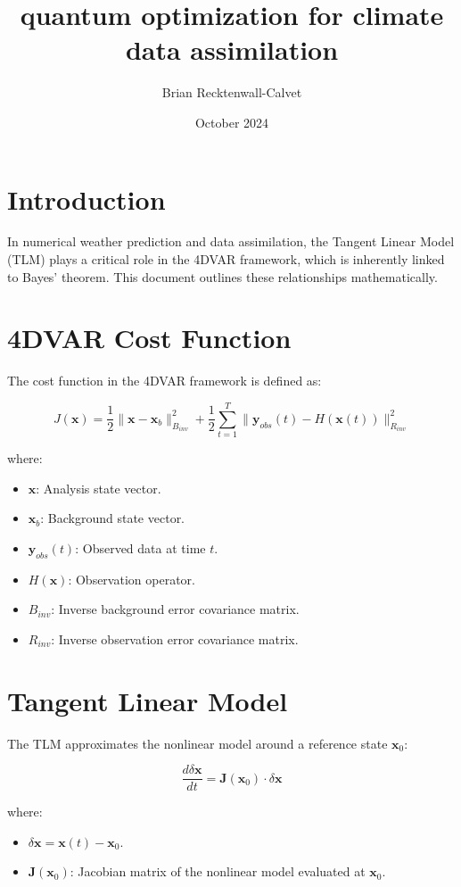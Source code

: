 \documentclass{article}
\title{quantum optimization for climate data assimilation}
\author{Brian Recktenwall-Calvet}
\date{October 2024}
\begin{document}
\maketitle

\section{Introduction}

In numerical weather prediction and data assimilation, the Tangent Linear Model (TLM) plays a critical role in the 4DVAR framework, which is inherently linked to Bayes' theorem. This document outlines these relationships mathematically.

\section{4DVAR Cost Function}

The cost function in the 4DVAR framework is defined as:

\[
J(\mathbf{x}) = \frac{1}{2} \|\mathbf{x} - \mathbf{x}_b\|_{B_{inv}}^2 + \frac{1}{2} \sum_{t=1}^{T} \|\mathbf{y}_{obs}(t) - H(\mathbf{x}(t))\|_{R_{inv}}^2
\]

where:
\begin{itemize}
    \item \( \mathbf{x} \): Analysis state vector.
    \item \( \mathbf{x}_b \): Background state vector.
    \item \( \mathbf{y}_{obs}(t) \): Observed data at time \( t \).
    \item \( H(\mathbf{x}) \): Observation operator.
    \item \( B_{inv} \): Inverse background error covariance matrix.
    \item \( R_{inv} \): Inverse observation error covariance matrix.
\end{itemize}

\section{Tangent Linear Model}

The TLM approximates the nonlinear model around a reference state \( \mathbf{x}_0 \):

\[
\frac{d \delta \mathbf{x}}{dt} = \mathbf{J}(\mathbf{x}_0) \cdot \delta \mathbf{x}
\]

where:
\begin{itemize}
    \item \( \delta \mathbf{x} = \mathbf{x}(t) - \mathbf{x}_0 \).
    \item \( \mathbf{J}(\mathbf{x}_0) \): Jacobian matrix of the nonlinear model evaluated at \( \mathbf{x}_0 \).
\end{itemize}
\end{document}
